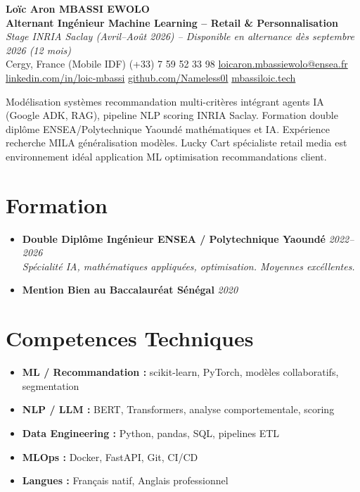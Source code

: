 \documentclass[a4paper,11pt]{article}
\begin{document}
\begin{center}
    {\Large \textbf{Lo\"ic Aron MBASSI EWOLO}} \\ \vspace{4pt}
    \textbf{\large Alternant Ing\'enieur Machine Learning -- Retail \& Personnalisation} \\
    \textit{\small Stage INRIA Saclay (Avril--Ao\^ut 2026) -- Disponible en alternance d\`es septembre 2026 (12 mois)} \\ \vspace{4pt}
    \small
    Cergy, France (Mobile IDF) \quad
    (+33) 7 59 52 33 98 \quad
    {\color{primary}\href{mailto:loicaron.mbassiewolo@ensea.fr}{loicaron.mbassiewolo@ensea.fr}} \\ \vspace{2pt}
    {\color{primary}\href{https://www.linkedin.com/in/loic-mbassi/}{linkedin.com/in/loic-mbassi}} \quad
    {\color{primary}\href{https://github.com/Nameless0l}{github.com/Nameless0l}} \quad
    {\color{primary}\href{https://mbassiloic.tech}{mbassiloic.tech}}
\end{center}
\vspace{-6pt}
\noindent\small{Mod\'elisation syst\`emes recommandation multi-crit\`eres int\'egrant agents IA (Google ADK, RAG), pipeline NLP scoring INRIA Saclay. Formation double dipl\^ome ENSEA/Polytechnique Yaound\'e math\'ematiques et IA. Exp\'erience recherche MILA g\'en\'eralisation mod\`eles. Lucky Cart sp\'ecialiste retail media est environnement id\'eal application ML optimisation recommandations client.}

\section{Formation}
\begin{itemize}[leftmargin=0.5cm, nosep]
    \item \textbf{Double Dipl\^ome Ing\'enieur ENSEA / Polytechnique Yaound\'e} \hfill \textit{2022--2026} \\
    \textit{Sp\'ecialit\'e IA, math\'ematiques appliqu\'ees, optimisation. Moyennes exc\'ellentes.}
    \item \textbf{Mention Bien au Baccalaur\'eat S\'en\'egal} \hfill \textit{2020}
\end{itemize}

\section{Competences Techniques}
\begin{itemize}[leftmargin=0.5cm, nosep]
    \item \textbf{ML / Recommandation :} scikit-learn, PyTorch, mod\`eles collaboratifs, segmentation
    \item \textbf{NLP / LLM :} BERT, Transformers, analyse comportementale, scoring
    \item \textbf{Data Engineering :} Python, pandas, SQL, pipelines ETL
    \item \textbf{MLOps :} Docker, FastAPI, Git, CI/CD
    \item \textbf{Langues :} Fran\c{c}ais natif, Anglais professionnel
\end{itemize}
\end{document}
